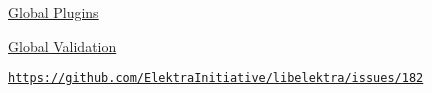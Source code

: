 \begin{DoxyItemize}
\item \hyperlink{doc_decisions_global_plugins_md}{Global Plugins}
\item \hyperlink{doc_decisions_global_validation_md}{Global Validation}
\end{DoxyItemize}

\href{https://github.com/ElektraInitiative/libelektra/issues/182}{\tt https\+://github.\+com/\+Elektra\+Initiative/libelektra/issues/182} 